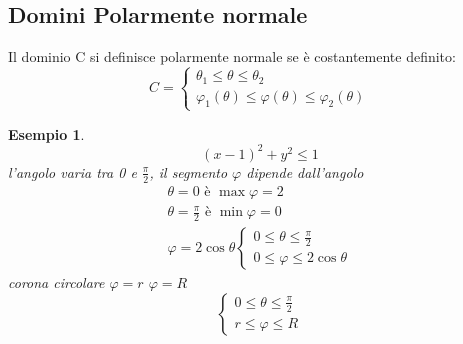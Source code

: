\documentclass{book}
\newtheorem{esempio}{Esempio}
\begin{document}
\subsection{Domini Polarmente normale}
Il dominio C si definisce polarmente normale se è costantemente definito:
\begin{equation}
	C=\begin{cases}
		\theta_1\leq \theta\leq \theta_2 \\
		\varphi_1(\theta)\leq \varphi(\theta)\leq \varphi_2(\theta)
	\end{cases}
\end{equation}
\begin{esempio}
  \begin{equation}
    (x-1)^2+y^2\leq 1
  \end{equation}
  l'angolo varia tra 0 e $\frac{\pi}{2}$, il segmento $\varphi$ dipende dall'angolo
  \begin{equation*}
    \begin{matrix}
      \theta=0\text{ è } \max \varphi=2 \\
      \theta=\frac{\pi}{2} \text{ è } \min \varphi=0 \\
      \varphi=2\cos \theta
      \begin{cases}
        0\leq \theta \leq \frac{\pi}{2}\\
        0\leq \varphi\leq 2\cos \theta
      \end{cases}
    \end{matrix}
  \end{equation*}
  corona circolare $\varphi=r$ $\varphi=R$
  \begin{equation*}
    \begin{cases}
      0\leq \theta \leq \frac{\pi}{2}\\
      r\leq \varphi\leq R
    \end{cases}
  \end{equation*}
\end{esempio}
\end{document}
